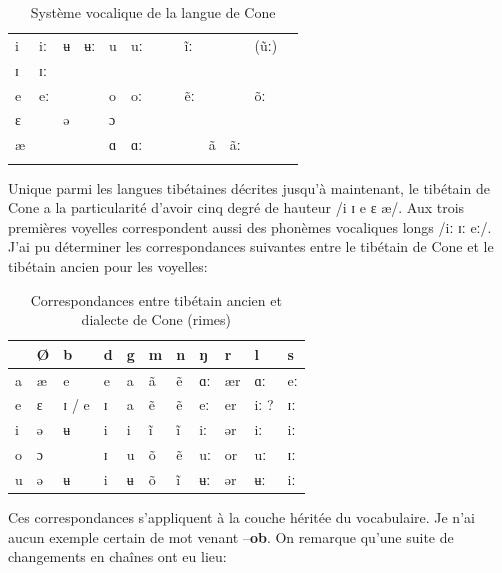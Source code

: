 \documentclass[oldfontcommands,oneside,a4paper,11pt]{memoir}
\newcommand{\ipa}[1]{{\phon\textbf{#1}}}
\begin{document}
\begin{table}[H]
\caption{Système vocalique de la langue de Cone}\label{tab:cone1}
\begin{tabular}{lllllllllllll} 
\toprule
i  &  	iː  &  	ʉ  &  	ʉː  &  	u  &  	uː  &  	   &  	   &  	ĩː  &  	   &  	   &  	(ũː)  &  \\
ɪ  &  	ɪː  &  	   &  	   &  	   &  	   &  	   &  	   &  	   &  	   &  	   &  	   &  \\
e  &  	eː  &  	   &  	   &  	o  &  	oː  &  	   &  	   &  	ẽː  &  	   &  	   &  	õː  &  \\
ɛ  &  	   &  	ə  &  	   &  	ɔ  &  	   &  	   &  	   &  	   &  	   &  	   &  	   &  \\
æ  &  	   &  	   &  	   &  	ɑ  &  	ɑː  &  	   &  	   &  	   &  	ã  &  	ãː  &  	   &  \\
  &  	  &  	  &  	  &  	  &  	  &  	  &  	  &  	  &  	  &  	  &  	  &  \\
\bottomrule
\end{tabular}
\end{table}
Unique parmi les langues tibétaines décrites jusqu'à maintenant, le tibétain de Cone a la particularité d'avoir cinq degré de hauteur /i ɪ e ɛ æ/. Aux trois premières voyelles correspondent aussi des  phonèmes vocaliques longs /iː ɪː eː/. J'ai pu déterminer les correspondances suivantes entre le tibétain de Cone et le tibétain ancien pour les voyelles:
\begin{table}[H]
\caption{Correspondances entre tibétain ancien et dialecte de Cone (rimes)}\label{tab:cone} \centering
\begin{tabular}{l|llllllllll} 
\toprule
   &  	Ø  &  	b  &  	d  &  	g  &  	m  &  	n  &  	ŋ  &  	r  &  	l  &  	s  \\
\midrule
a  &  	æ  &  	e  &  	e  &  	a  &  	ã  &  	ẽ  &  	ɑː  &  	ær  &  	ɑː  &  	eː   \\
e  &  	ɛ  &  	ɪ / e  &  	ɪ  &  	a  &  	ẽ  &  	ẽ  &  	eː  &  	er  &  	iː ?  &  	ɪː   \\
i  &  	ə  &  	ʉ  &  	i  &  	i  &  	ĩ  &  	ĩ  &  	iː  &  	ər  &  	iː  &  	iː   \\
o  &  	ɔ  &  	   &  	ɪ  &  	u  &  	õ  &  	ẽ  &  	uː  &  	or  &  	uː  &  	ɪː   \\
u  &  	ə  &  	ʉ  &  	i  &  	ʉ  &  	õ  &  	ĩ  &  	ʉː  &  	ər  &  	ʉː  &  	iː   \\ 
\bottomrule
\end{tabular}
\end{table}
Ces correspondances s'appliquent à la couche héritée du vocabulaire. Je n'ai aucun exemple certain de mot venant --\ipa{ob}. On remarque qu'une suite de changements en chaînes ont eu lieu: 
\end{document}
